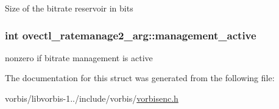 Size of the bitrate reservoir in bits \hypertarget{structovectl__ratemanage2__arg_aca1f656373a1597177dac924578e375b}{
\subsubsection[{management\+\_\+active}]{\setlength{\rightskip}{0pt plus 5cm}int ovectl\+\_\+ratemanage2\+\_\+arg\+::management\+\_\+active}}\label{structovectl__ratemanage2__arg_aca1f656373a1597177dac924578e375b}
nonzero if bitrate management is active 

The documentation for this struct was generated from the following file\+:\begin{DoxyCompactItemize}
\item 
vorbis/libvorbis-\/1../include/vorbis/\hyperlink{vorbisenc_8h}{vorbisenc.\+h}\end{DoxyCompactItemize}
